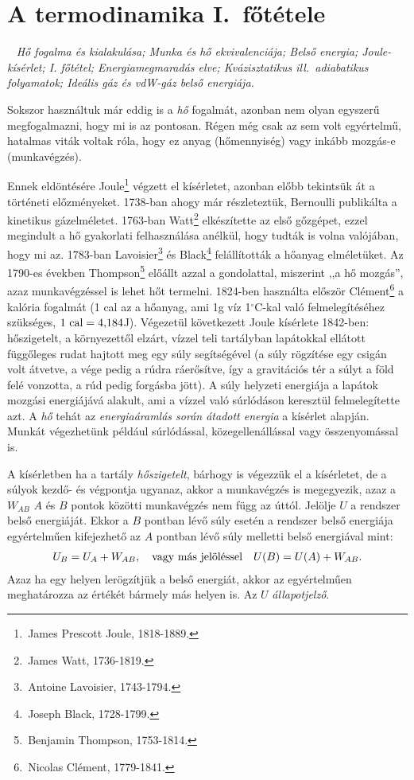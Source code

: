 \section{A termodinamika I.~főtétele}~
\emph{Hő fogalma és kialakulása; Munka és hő ekvivalenciája; Belső energia; Joule-kísérlet; I. főtétel; Energiamegmaradás elve; Kvázisztatikus ill.\ adiabatikus folyamatok; Ideális gáz és vdW-gáz belső energiája.}

Sokszor használtuk már eddig is a \emph{hő} fogalmát, azonban nem olyan egyszerű megfogalmazni, hogy mi is az pontosan. Régen még csak az sem volt egyértelmű, hatalmas viták voltak róla, hogy ez anyag (hőmennyiség) vagy inkább mozgás-e (munkavégzés).

Ennek eldöntésére Joule\footnote{\,James Prescott Joule, 1818-1889.} végzett el kísérletet, azonban előbb tekintsük át a történeti előzményeket. 1738-ban ahogy már részleteztük, Bernoulli publikálta a kinetikus gázelméletet. 1763-ban Watt\footnote{\,James Watt, 1736-1819.} elkészítette az első gőzgépet, ezzel megindult a hő gyakorlati felhasználása anélkül, hogy tudták is volna valójában, hogy mi az. 1783-ban Lavoisier\footnote{\,Antoine Lavoisier, 1743-1794.} és Black\footnote{\,Joseph Black, 1728-1799.} felállították a hőanyag elméletüket. Az 1790-es években Thompson\footnote{\,Benjamin Thompson, 1753-1814.} előállt azzal a gondolattal, miszerint ,,a hő mozgás'', azaz munkavégzéssel is lehet hőt termelni. 1824-ben használta először Clément\footnote{\,Nicolas Clément, 1779-1841.} a kalória fogalmát (1 cal az a hőanyag, ami 1g víz 1$^\circ$C-kal való felmelegítéséhez szükséges, $1\textnormal{ cal} = 4{,}184$J). Végezetül következett Joule kísérlete 1842-ben: hőszigetelt, a környezettől elzárt, vízzel teli tartályban lapátokkal ellátott függőleges rudat hajtott meg egy súly segítségével (a súly rögzítése egy csigán volt átvetve, a vége pedig a rúdra ráerősítve, így a gravitációs tér a súlyt a föld felé vonzotta, a rúd pedig forgásba jött). A súly helyzeti energiája a lapátok mozgási energiájává alakult, ami a vízzel való súrlódáson keresztül felmelegítette azt. A \emph{hő} tehát az \emph{energiaáramlás során átadott energia} a kísérlet alapján. Munkát végezhetünk például súrlódással, közegellenállással vagy összenyomással is.

A kísérletben ha a tartály \emph{hőszigetelt}, bárhogy is végezzük el a kísérletet, de a súlyok kezdő- és végpontja ugyanaz, akkor a munkavégzés is megegyezik, azaz a $W_{AB}$ $A$ és $B$ pontok közötti munkavégzés nem függ az úttól. Jelölje $U$ a rendszer belső energiáját. Ekkor a $B$ pontban lévő súly esetén a rendszer belső energiája egyértelműen kifejezhető az $A$ pontban lévő súly melletti belső energiával mint:
\begin{align}
    U_B = U_A + W_{AB},\quad \textnormal{vagy más jelöléssel}\quad U(B) = U(A) + W_{AB}.
\end{align}
Azaz ha egy helyen lerögzítjük a belső energiát, akkor az egyértelműen meghatározza az értékét bármely más helyen is. Az $U$ \emph{állapotjelző}.

